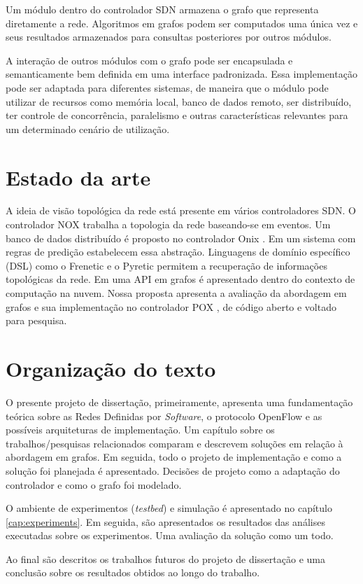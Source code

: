 Um módulo dentro do controlador SDN armazena o grafo que representa diretamente
a rede.
Algoritmos em grafos podem ser computados uma única vez e seus resultados 
armazenados para consultas posteriores por outros módulos.

A interação de outros módulos com o grafo pode ser encapsulada e 
semanticamente bem definida em uma interface padronizada.
Essa implementação pode ser adaptada para diferentes sistemas, de maneira que
o módulo pode utilizar de recursos como memória local, banco de dados remoto,
ser distribuído, ter controle de concorrência, paralelismo e outras 
características relevantes para um determinado cenário de utilização.

\section{Estado da arte}

A ideia de visão topológica da rede está presente em vários controladores SDN.
O controlador NOX \citep{gude2008nox} trabalha a topologia da rede baseando-se
em eventos.
Um banco de dados distribuído é proposto no controlador Onix 
\citep{teemu2010onix}.
Em \citep{hinrichs2009pratical} um sistema com regras de predição 
estabelecem essa abstração.
Linguagens de domínio específico (DSL) como o Frenetic 
\citep{foster2011frenetic} e o Pyretic \citep{monsanto2013composing} permitem
a recuperação de informações topológicas da rede.
Em \citep{ramya2012dynamic} uma API em grafos é apresentado dentro do contexto
de computação na nuvem.
Nossa proposta apresenta a avaliação da abordagem em grafos e sua implementação
no controlador POX \citep{pox2015}, de código aberto e voltado para pesquisa.

\section{Organização do texto}

O presente projeto de dissertação, primeiramente, apresenta uma fundamentação
teórica sobre as Redes Definidas por \emph{Software}, o protocolo OpenFlow e
as possíveis arquiteturas de implementação.
Um capítulo sobre os trabalhos/pesquisas relacionados comparam e descrevem
soluções em relação à abordagem em grafos.
Em seguida, todo o projeto de implementação e como a solução foi planejada
é apresentado. 
Decisões de projeto como a adaptação do controlador e como o grafo foi 
modelado.

O ambiente de experimentos (\emph{testbed}) e simulação é apresentado no 
capítulo \ref{cap:experiments}.
Em seguida, são apresentados os resultados das análises executadas sobre os
experimentos.
Uma avaliação da solução como um todo.

Ao final são descritos os trabalhos futuros do projeto de dissertação e uma
conclusão sobre os resultados obtidos ao longo do trabalho.
